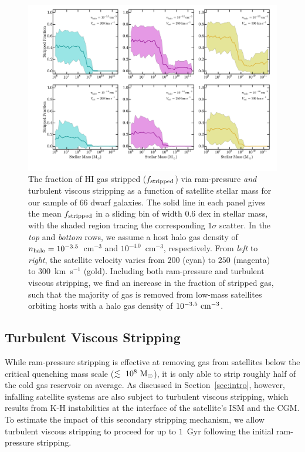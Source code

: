 \begin{figure}
 \centering
 \hspace*{-0.5in}
   \includegraphics[width=6in]{underpressure/f6.pdf}
   \caption[The Efficiency of both ram-pressure and turbulent viscous stripping]{The fraction of H{\scriptsize I} gas stripped ($f_{\rm
       stripped}$) via ram-pressure \emph{and} turbulent viscous
     stripping as a function of satellite stellar mass for our sample
     of $66$ dwarf galaxies. The solid line in each panel gives the
     mean $f_{\rm stripped}$ in a sliding bin of width $0.6$ dex in
     stellar mass, with the shaded region tracing the corresponding
     $1\sigma$ scatter. In the \emph{top} and \emph{bottom} rows, we
     assume a host halo gas density of $n_{\rm
       halo}=10^{-3.5}$~cm$^{-3}$ and $10^{-4.0}$~cm$^{-3}$,
     respectively. From \emph{left} to \emph{right}, the satellite
     velocity varies from $200$ (cyan) to $250$ (magenta) to
     $300$~km~s$^{-1}$ (gold). Including both ram-pressure and
     turbulent viscous stripping, we find an increase in the fraction
     of stripped gas, such that the majority of gas is removed from
     low-mass satellites orbiting hosts with a halo gas density of
     $10^{-3.5}~{\rm cm}^{-3}$.} 
 \label{fig:MW_KH}
\end{figure}



\subsection{Turbulent Viscous Stripping}
\label{subsec:viscous}


While ram-pressure stripping is effective at removing gas from
satellites below the critical quenching mass scale
($\lesssim~10^{8}~{\rm M}_{\odot}$), it is only able to strip roughly half of
the cold gas reservoir on average.
%
As discussed in Section~\ref{sec:intro}, however, infalling satellite
systems are also subject to turbulent viscous stripping, which results
from K-H instabilities at the interface of the satellite's ISM and the
CGM.
%
To estimate the impact of this secondary stripping mechanism, we allow
turbulent viscous stripping to proceed for up to $1$~Gyr following the
initial ram-pressure stripping.


